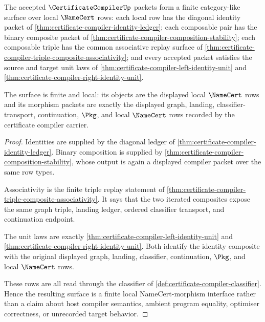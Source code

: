 \begin{theorem}
\label{thm:certificate-compiler-finite-category-surface}
The accepted $\CertificateCompilerUp$ packets form a finite category-like
surface over local $\NameCert$ rows: each local row has the diagonal identity
packet of \autoref{thm:certificate-compiler-identity-ledger}; each composable
pair has the binary composite packet of
\autoref{thm:certificate-compiler-composition-stability}; each composable
triple has the common associative replay surface of
\autoref{thm:certificate-compiler-triple-composite-associativity}; and every
accepted packet satisfies the source and target unit laws of
\autoref{thm:certificate-compiler-left-identity-unit} and
\autoref{thm:certificate-compiler-right-identity-unit}.

The surface is finite and local: its objects are the displayed local
$\NameCert$ rows and its morphism packets are exactly the displayed graph,
landing, classifier-transport, continuation, $\Pkg$, and local $\NameCert$
rows recorded by the certificate compiler carrier.
\end{theorem}
\begin{proof}
Identities are supplied by the diagonal ledger of
\autoref{thm:certificate-compiler-identity-ledger}. Binary composition is
supplied by \autoref{thm:certificate-compiler-composition-stability}, whose
output is again a displayed compiler packet over the same row types.

Associativity is the finite triple replay statement of
\autoref{thm:certificate-compiler-triple-composite-associativity}. It says
that the two iterated composites expose the same graph triple, landing ledger,
ordered classifier transport, and continuation endpoint.

The unit laws are exactly
\autoref{thm:certificate-compiler-left-identity-unit} and
\autoref{thm:certificate-compiler-right-identity-unit}. Both identify the
identity composite with the original displayed graph, landing, classifier,
continuation, $\Pkg$, and local $\NameCert$ rows.

These rows are all read through the classifier of
\autoref{def:certificate-compiler-classifier}. Hence the resulting surface is
a finite local NameCert-morphism interface rather than a claim about host
compiler semantics, ambient program equality, optimiser correctness, or
unrecorded target behavior.
\end{proof}

